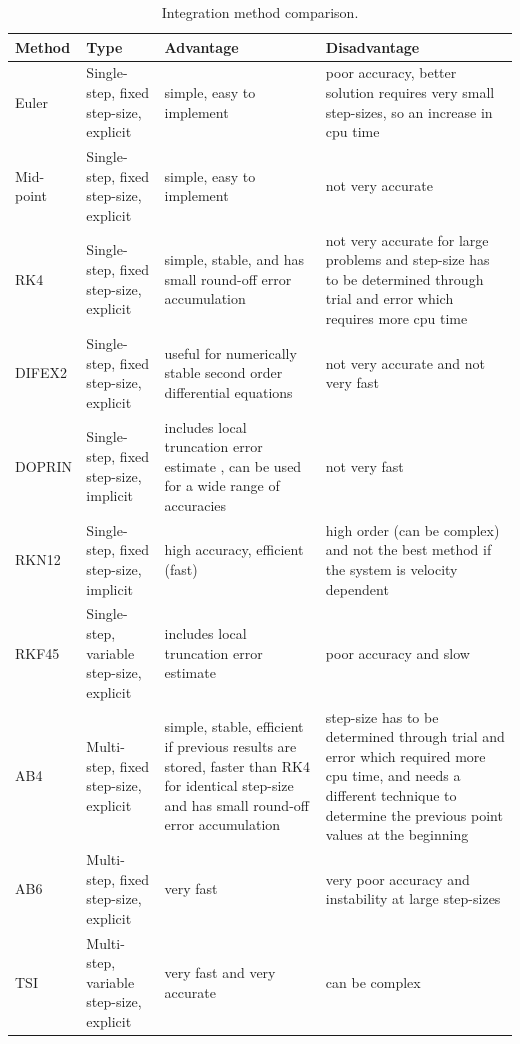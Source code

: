 \begin{longtable}{|p{1.1cm}|p{3cm}|p{5cm}|p{5cm}|}
\caption{Integration method comparison.}
\label{tab:intmethcomp}
\endfirsthead
\endhead
\hline 
\textbf{Method} 		& \textbf{Type} & \textbf{Advantage} & \textbf{Disadvantage} \\ \hline \hline
Euler	& Single-step, fixed step-size, explicit  & simple, easy to implement & poor accuracy, better solution requires very small step-sizes, so an increase in cpu time \\ \hline
Mid-point	& Single-step, fixed step-size, explicit & simple, easy to implement & not very accurate \\ \hline
\ac{RK4}	& Single-step, fixed step-size, explicit & simple, stable, and has small round-off error accumulation & not very accurate for large problems and step-size has to be determined through trial and error which requires more cpu time \\ \hline
DIFEX2	& Single-step, fixed step-size, explicit & useful for numerically stable second order differential equations & not very accurate and not very fast \\ \hline
DOPRIN	& Single-step, fixed step-size, implicit & includes local truncation error estimate \cite{dormand1987}, can be used for a wide range of accuracies \cite{montenbruck1992} & not very fast \\ \hline
\ac{RKN12} 	& Single-step, fixed step-size, implicit & high accuracy, efficient (fast)  & high order (can be complex) and not the best method if the system is velocity dependent \cite{montenbruck1992} \\ \hline
\ac{RKF45}	& Single-step, variable step-size, explicit & includes local truncation error estimate & poor accuracy and slow \\ \hline
\ac{AB4}	& Multi-step, fixed step-size, explicit & simple, stable, efficient if previous results are stored, faster than \ac{RK4} for identical step-size and has small round-off error accumulation & step-size has to be determined through trial and error which required more cpu time, and needs a different technique to determine the previous point values at the beginning \\ \hline
\ac{AB6}	& Multi-step, fixed step-size, explicit & very fast & very poor accuracy and instability at large step-sizes \cite{montenbruck1992} \\ \hline
\ac{TSI} & Multi-step, variable step-size, explicit & very fast and very accurate \cite{scott2008high} & can be complex  \\ \hline

\end{longtable}
